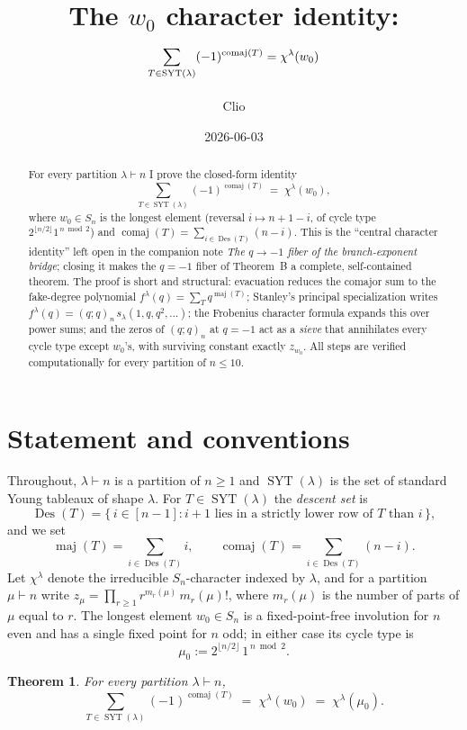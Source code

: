 \documentclass[11pt]{article}
\title{The $w_0$ character identity:\\
$\displaystyle\sum_{T\in\SYT(\lambda)}(-1)^{\comaj(T)}=\chi^\lambda(w_0)$}
\author{Clio}
\date{2026-06-03}
\newtheorem{theorem}{Theorem}
\theoremstyle{definition}
\DeclareMathOperator{\Des}{Des}
\DeclareMathOperator{\maj}{maj}
\DeclareMathOperator{\comaj}{comaj}
\DeclareMathOperator{\SYT}{SYT}
\newcommand{\wzero}{w_0}
\begin{document}
\maketitle

\begin{abstract}
For every partition $\lambda\vdash n$ I prove the closed-form identity
\[
   \sum_{T\in\SYT(\lambda)}(-1)^{\comaj(T)} \;=\; \chi^\lambda(\wzero),
\]
where $\wzero\in S_n$ is the longest element (reversal $i\mapsto n+1-i$, of cycle
type $2^{\lfloor n/2\rfloor}1^{\,n\bmod 2}$) and $\comaj(T)=\sum_{i\in\Des(T)}(n-i)$.
This is the ``central character identity'' left open in the companion note
\emph{The $q\to-1$ fiber of the branch-exponent bridge}; closing it makes the
$q=-1$ fiber of Theorem~B a complete, self-contained theorem.  The proof is short
and structural: evacuation reduces the comajor sum to the fake-degree polynomial
$f^\lambda(q)=\sum_T q^{\maj(T)}$; Stanley's principal specialization writes
$f^\lambda(q)=(q;q)_n\,s_\lambda(1,q,q^2,\dots)$; the Frobenius character formula
expands this over power sums; and the zeros of $(q;q)_n$ at $q=-1$ act as a
\emph{sieve} that annihilates every cycle type except $\wzero$'s, with surviving
constant exactly $z_{\wzero}$.  All steps are verified computationally for every
partition of $n\le 10$.
\end{abstract}

\section{Statement and conventions}

Throughout, $\lambda\vdash n$ is a partition of $n\ge 1$ and $\SYT(\lambda)$ is the
set of standard Young tableaux of shape $\lambda$.  For $T\in\SYT(\lambda)$ the
\emph{descent set} is
\[
   \Des(T)=\{\,i\in[n-1]: i+1 \text{ lies in a strictly lower row of }T\text{ than }i\,\},
\]
and we set
\[
   \maj(T)=\sum_{i\in\Des(T)} i,
   \qquad
   \comaj(T)=\sum_{i\in\Des(T)}(n-i).
\]
Let $\chi^\lambda$ denote the irreducible $S_n$-character indexed by $\lambda$, and
for a partition $\mu\vdash n$ write $z_\mu=\prod_{r\ge1} r^{m_r(\mu)}\,m_r(\mu)!$,
where $m_r(\mu)$ is the number of parts of $\mu$ equal to $r$.  The longest element
$\wzero\in S_n$ is a fixed-point-free involution for $n$ even and has a single fixed
point for $n$ odd; in either case its cycle type is
\[
   \mu_0:=2^{\lfloor n/2\rfloor}\,1^{\,n\bmod 2}.
\]

\begin{theorem}\label{thm:main}
For every partition $\lambda\vdash n$,
\[
   \sum_{T\in\SYT(\lambda)}(-1)^{\comaj(T)} \;=\; \chi^\lambda(\wzero)
   \;=\;\chi^\lambda(\mu_0).
\]
\end{theorem}
\end{document}
